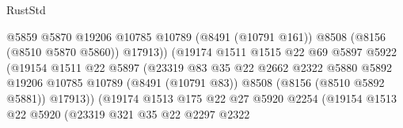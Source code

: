 \begin{lexlean}{RustStd}
\begin{coremodule}
{\begin{coremodule}
{{{{{{{{{{{{{{{{{{{{{{{{{{{{{{{{{{                                          @5859
                                          @5870
                                          @19206
                                          @10785
                                          @10789
                                          (@8491 (@10791 @161))
                                          @8508
                                          (@8156 (@8510 @5870 @5860))
                                          @17913))
                                      (@19174
                                        @1511
                                        @1515
                                        @22
                                        @69
                                        @5897
                                        @5922
                                        (@19154
                                          @1511
                                          @22
                                          @5897
                                          (@23319
                                            @83
                                            @35
                                            @22
                                            @2662
                                            @2322
                                            @5880
                                            @5892
                                            @19206
                                            @10785
                                            @10789
                                            (@8491 (@10791 @83))
                                            @8508
                                            (@8156 (@8510 @5892 @5881))
                                            @17913))
                                        (@19174
                                          @1513
                                          @175
                                          @22
                                          @27
                                          @5920
                                          @2254
                                          (@19154
                                            @1513
                                            @22
                                            @5920
                                            (@23319
                                              @321
                                              @35
                                              @22
                                              @2297
                                              @2322
}}}}}}}}}}}}}}}}}}}}}}}}}}}}}}}}}}
\end{coremodule}}
\end{coremodule}
\end{lexlean}
